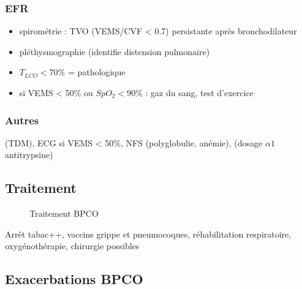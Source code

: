 \subsubsection{EFR}
\begin{itemize}
\item spirométrie : TVO (VEMS/CVF < 0.7) persistante après bronchodilateur
\item pléthysmographie (identifie distension pulmonaire)
\item $T_{LCO} < 70\%$ = pathologique
\item si VEMS < 50\% ou $SpO_2< 90$\% : gaz du sang, test d'exercice
\end{itemize}

\subsubsection{Autres}
(TDM), ECG si VEMS < 50\%, NFS (polyglobulie, anémie), (dosage \(\alpha1\) antitrypsine)

\subsection{Traitement}
\begin{figure}[htpb]
  \centering
  \caption{Traitement BPCO}
\end{figure}

Arrêt tabac++, vaccins grippe et pneumocoques, réhabilitation respiratoire, oxygénothérapie, chirurgie possibles

\subsection{Exacerbations BPCO}
\label{subsec:ebpco}

